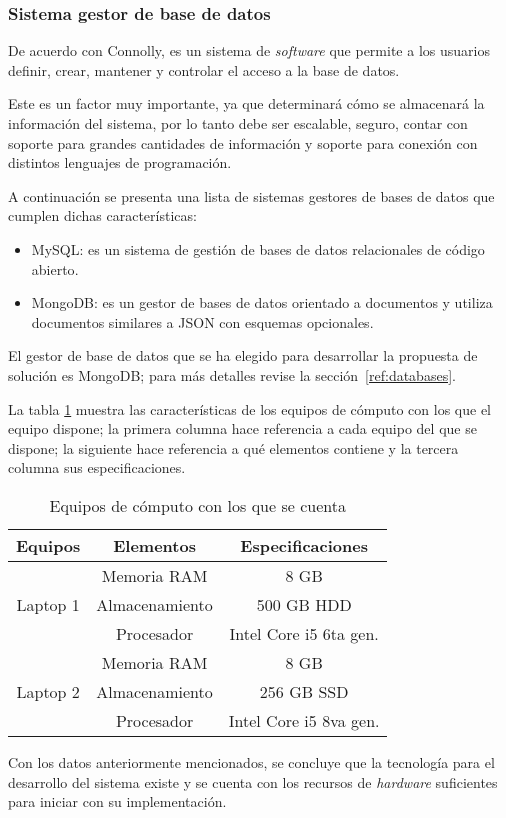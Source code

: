 \subsubsection*{Sistema gestor de base de datos}

De acuerdo con Connolly\cite{connolly_database_2005}, es un sistema de \textit{software} que permite a los usuarios definir, crear, mantener y controlar el acceso a la base de datos.


Este es un factor muy importante, ya que determinará cómo se almacenará la información del sistema, por lo tanto debe ser escalable, seguro, contar con soporte para grandes cantidades de información y soporte para conexión con distintos lenguajes de programación.


A continuación se presenta una lista de sistemas gestores de bases de datos que cumplen dichas características:

\begin{itemize}
    \item MySQL: es un sistema de gestión de bases de datos relacionales de código abierto\cite{dubois_mysql_1999}.
    \item MongoDB: es un gestor de bases de datos orientado a documentos y utiliza documentos similares a JSON con esquemas opcionales\cite{banker_mongodb_2011}.
\end{itemize}

El gestor de base de datos que se ha elegido para desarrollar la propuesta de solución es MongoDB; para más detalles revise la sección~\ref{ref:databases}.


La tabla \ref{tab:hw_devices} muestra las características de los equipos de cómputo con los que el equipo dispone; la primera columna hace referencia a cada equipo del que se dispone; la siguiente hace referencia a qué elementos contiene y la tercera columna sus especificaciones.

\begin{table}[H]
    \centering
    \begin{tabular}{|c|c|c|}
        \hline
        Equipos & Elementos & Especificaciones \\ \hline
        \multirow{3}{*}{Laptop 1} & Memoria RAM & 8 GB \\
        & Almacenamiento & 500 GB HDD \\
        & Procesador & Intel Core i5 6ta gen. \\ \hline
        \multirow{3}{*}{Laptop 2} & Memoria RAM & 8 GB \\
        & Almacenamiento & 256 GB SSD \\
        & Procesador & Intel Core i5 8va gen.\\ \hline
    \end{tabular}
    \caption{Equipos de cómputo con los que se cuenta}
    \label{tab:hw_devices}
\end{table}


Con los datos anteriormente mencionados, se concluye que la tecnología para el desarrollo del sistema existe y se cuenta con los recursos de \textit{hardware} suficientes para iniciar con su implementación.